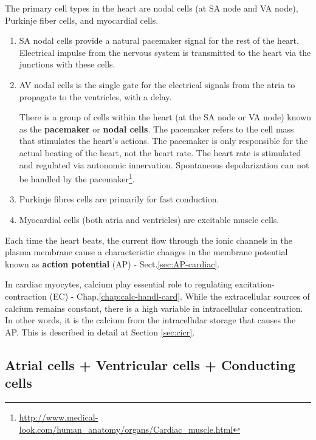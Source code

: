 The primary cell types in the heart are nodal cells
(at SA node and VA node), Purkinje fiber cells, and myocardial cells.
\begin{enumerate}
\item SA nodal cells provide a natural pacemaker signal for the rest
  of the heart. Electrical impulse from the nervous system is
  transmitted to the heart via the junctions with these cells.

\item AV nodal cells is the single gate for the electrical signals
  from the atria to propagate to the ventricles, with a delay.

\begin{mdframed}

There is a group of cells within the heart (at the SA node or VA node)
known as the {\bf pacemaker} or {\bf nodal cells}.
The pacemaker refers to the cell mass that stimulates the heart's
actions. The pacemaker is only responsible for the actual beating of
the heart, not the heart rate. The heart rate is stimulated and
regulated via autonomic innervation. Spontaneous depolarization can
not be handled by the
pacemaker\footnote{\url{http://www.medical-look.com/human_anatomy/organs/Cardiac_muscle.html}}.

\end{mdframed}
 
\item Purkinje fibres cells are primarily for fast conduction.

\item Myocardial cells (both atria and ventricles) are excitable
  muscle cells.
\end{enumerate}
Each time the heart beats, the current flow through the ionic channels in the
plasma membrane cause a characteristic changes in the membrane potential known
as {\bf action potential} (AP) - Sect.\ref{sec:AP-cardiac}.

In cardiac myocytes, calcium play essential role to regulating
excitation-contraction (EC) - Chap.\ref{chap:calc-handl-card}. While the
extracellular sources of calcium remains constant, there is a high variable in
intracellular concentration. In other words, it is the calcium from the
intracellular  storage that causes the AP. This is described in detail
at Section \ref{sec:cicr}.

\subsection{Atrial cells + Ventricular cells + Conducting cells}

